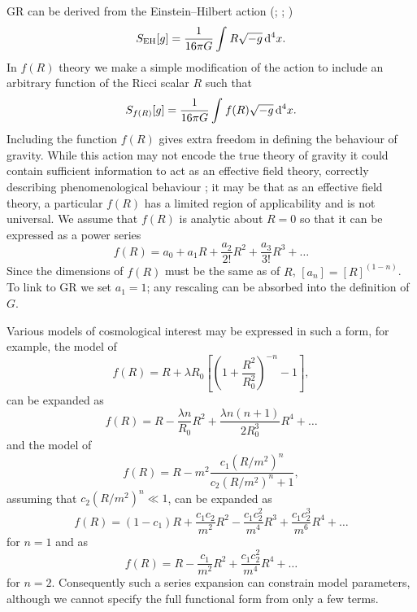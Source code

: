 GR can be derived from the Einstein--Hilbert action (\citealt[chapter 21]{Misner1973}; \citealt[section 93]{Landau1975}; \citealt[section 26]{Dirac1996})
\begin{equation}
S_\mathrm{EH}[g] = \dfrac{1}{16\pi G}\int_{}^{}{R\sqrt{-g}}\,\mathrm{d}{^4x}.
\end{equation}
In $f(R)$ theory we make a simple modification of the action to include an arbitrary function of the Ricci scalar $R$ such that \citep{Buchdahl1970}
\begin{equation}
S_{f(R)}[g] = \dfrac{1}{16\pi G}\int_{}^{}{f(R)\sqrt{-g}}\,\mathrm{d}{^4x}.
\end{equation}
Including the function $f(R)$ gives extra freedom in defining the behaviour of gravity. While this action may not encode the true theory of gravity it could contain sufficient information to act as an effective field theory, correctly describing phenomenological behaviour \citep{Park2010}; it may be that as an effective field theory, a particular $f(R)$ has a limited region of applicability and is not universal. We assume that $f(R)$ is analytic about $R = 0$ so that it can be expressed as a power series \citep{Buchdahl1970, Faulkner2007, Clifton2008} %
\begin{equation}
f(R) = a_0 + a_1 R + \dfrac{a_2}{2!}R^2 + \dfrac{a_3}{3!}R^3 + \ldots
\end{equation}
Since the dimensions of $f(R)$ must be the same as of $R$, $[a_n] = [R]^{(1-n)}$. To link to GR we set $a_1 = 1$; any rescaling can be absorbed into the definition of $G$.

Various models of cosmological interest may be expressed in such a form, for example, the model of \citet{Starobinsky2007}
\begin{equation}
f(R) = R + \lambda R_0 \left[\left(1 + \dfrac{R^2}{R_0^2}\right)^{-n} - 1\right],
\end{equation}
can be expanded as
\begin{equation}
f(R) = R - \dfrac{\lambda n}{R_0} R^2 + \dfrac{\lambda n (n + 1)}{2 R_0^3} R^4 + \ldots
\end{equation}
and the model of \citet{Hu2007}
\begin{equation}
f(R) = R - m^2\dfrac{c_1\left(R/m^2\right)^n}{c_2\left(R/m^2\right)^n + 1},
\end{equation}
assuming that $c_2(R/m^2)^n \ll 1$, can be expanded as
\begin{equation}
f(R) = (1 - c_1)R + \dfrac{c_1 c_2}{m^2}R^2 - \dfrac{c_1 c_2^2}{m^4}R^3 + \dfrac{c_1 c_2^3}{m^6}R^4 + \ldots 
\end{equation}
for $n = 1$ and as
\begin{equation}
f(R) = R - \dfrac{c_1}{m^2}R^2 + \dfrac{c_1 c_2^2}{m^4}R^4 + \ldots
\end{equation}
for $n = 2$. Consequently such a series expansion can constrain model parameters, although we cannot specify the full functional form from only a few terms.

